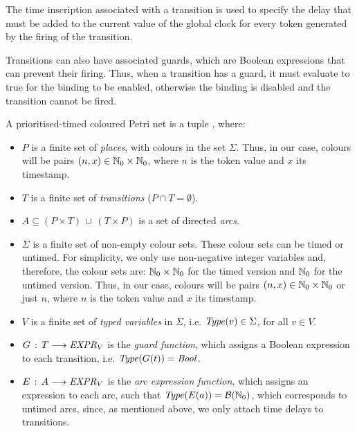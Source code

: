 The time inscription associated with a transition 
is used to specify the delay that must be added to the
current value of the global clock for
every token generated by the firing of the transition.

Transitions can also have associated guards, which
are Boolean expressions that can prevent their firing.
Thus, when a transition has a guard, it must evaluate to
true for the binding to be enabled,
otherwise the binding is disabled and 
the transition cannot be fired. 

\begin{definition} \label{ptcpndef}
A prioritised-timed coloured Petri net is a tuple \ptcpntuple, where: %
\begin{itemize}
\item $P$ is a finite set of {\em places}, with colours
in the set $\Sigma$. Thus, in our case, colours 
will be pairs $(n,x)\in \mathbb{N}_{0} \times \mathbb{N}_{0}$, where $n$ is
the token value and $x$ its timestamp.
%
\item $T$ is a finite set of {\em transitions} ($P\cap T = \emptyset$).
%
\item $A \subseteq (P\times T)\,\cup\,(T \times P)$ is a
set of directed {\em arcs}.
%
\item $\Sigma$ is a finite set of non-empty colour sets. These colour sets can be timed or untimed. For simplicity,
we only use non-negative integer variables and, therefore, the colour sets are: 
$\mathbb{N}_{0} \times \mathbb{N}_{0}$ for the timed version and $\mathbb{N}_{0}$ for the untimed version. Thus, in our case, colours 
will be pairs $(n,x)\in \mathbb{N}_{0} \times \mathbb{N}_{0}$ or just $n$, where $n$ is
the token value and $x$ its timestamp.
%
\item $V$ is a finite set of {\em typed variables} in $\Sigma$, 
i.e. ${\it Type}(v) \in \Sigma$, for all $v \in V$.
%
%
\item $G\,:\, T \longrightarrow {\it EXPR}_V$ is the
{\em guard function}, which assigns a Boolean
expression
to each transition, i.e. ${\it Type}(G(t))={\it Bool}$. 
%
\item $E\,:\, A \longrightarrow {\it EXPR}_V$ is the
{\em arc expression function}, which assigns an expression
to each arc, such that ${\it Type}(E(a)) = {\cal B}(\mathbb{N}_{0})$,
which corresponds to untimed arcs, since, as mentioned above,
we only attach time delays to transitions.


\end{itemize}
\end{definition}
